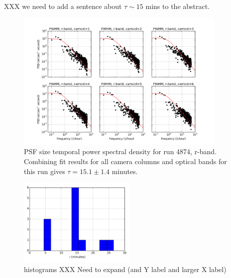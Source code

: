 XXX we need to add a sentence about $\tau \sim 15$ mins to the abstract. 

\begin{figure}
\centering
\includegraphics[width=0.9\textwidth]{FIGURES/temporalPSD.png}
\caption{PSF size temporal power spectral density for run 4874, r-band. 
Combining fit results for all camera columns and optical bands for
this run
gives $\tau = 15.1 \pm 1.4$ minutes.
\label{fig:psd}}
\end{figure}

\begin{figure}
\centering
\includegraphics[width=0.5\textwidth]{FIGURES/hist.png}
\caption{histograms XXX Need to expand (and Y label and larger X label) 
\label{fig:hist}}
\end{figure}

